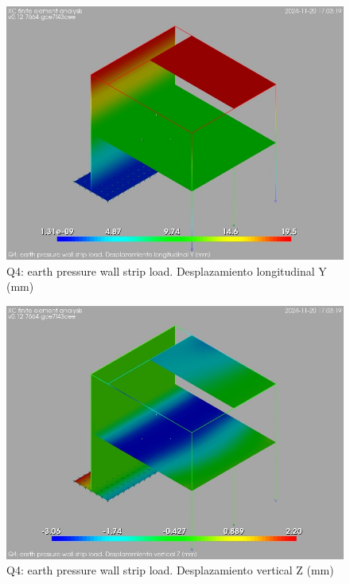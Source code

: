 \begin{figure}[ht]
\begin{center}
\includegraphics[width=\linewidth]{results/graphics/resSimplLC/QearthPWallStrLuY.png}
\caption{Q4: earth pressure wall strip load. Desplazamiento longitudinal Y (mm)}
\label{QearthPWallStrLuY}
\end{center}
\end{figure}
\begin{figure}[ht]
\begin{center}
\includegraphics[width=\linewidth]{results/graphics/resSimplLC/QearthPWallStrLuZ.png}
\caption{Q4: earth pressure wall strip load. Desplazamiento vertical Z (mm)}
\label{QearthPWallStrLuZ}
\end{center}
\end{figure}
